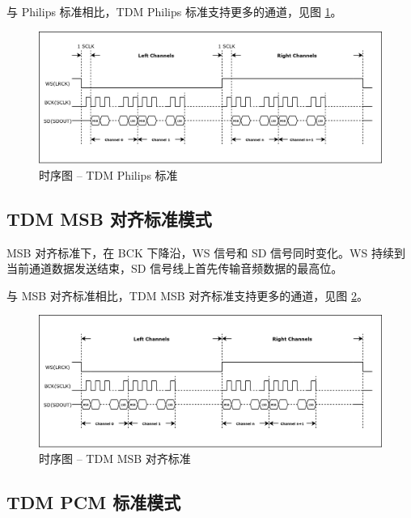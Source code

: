 \documentclass[main\_\_CN.tex]{subfiles}
\begin{document}
与 Philips 标准相比，TDM Philips 标准支持更多的通道，见图 \ref{Figure:i2s_phillips_standard}。
\begin{figure}[H]
    \centering
    \includegraphics[width=1.0\textwidth]{03-I2S/figures/i2s_tdm_phillips_mode.png}
    \caption{时序图 -- TDM Philips 标准}
    \label{Figure:i2s_phillips_standard}
\end{figure}

\subsection{TDM MSB 对齐标准模式}

MSB 对齐标准下，在 BCK 下降沿，WS 信号和 SD 信号同时变化。WS 持续到当前通道数据发送结束，SD 信号线上首先传输音频数据的最高位。

与 MSB 对齐标准相比，TDM MSB 对齐标准支持更多的通道，见图 \ref{Figure:i2s_MSB_32_mode}。

\begin{figure}[H]
    \centering
    \includegraphics[width=1.0\textwidth]{03-I2S/figures/i2s_tdm_msb_mode.png}
    \caption{时序图 -- TDM MSB 对齐标准}
    \label{Figure:i2s_MSB_32_mode}
\end{figure}


\subsection{TDM PCM 标准模式}
\end{document}
